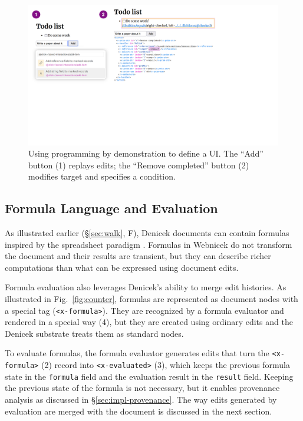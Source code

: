 \documentclass[sigconf]{acmart}
\begin{document}
\begin{figure}[t]
\includegraphics[width=1\columnwidth,clip,trim=0.5cm 8.5cm 8.5cm 0.5cm]{fig/interactive.pdf}
\caption{Using programming by demonstration to define a UI. The ``Add'' button (1) replays edits;
the ``Remove completed'' button (2) modifies target and specifies a condition. }
\label{fig:interactive}
\end{figure}


\subsection{Formula Language and Evaluation}
\label{sec:impl-eval}

As illustrated earlier (\S\ref{sec:walk}, F), Denicek documents can contain formulas inspired by the
spreadsheet paradigm \cite{nardi-1990-spreadsheets}. Formulas in Webnicek do not transform the
document and their results are transient, but they can describe richer computations than what can
be expressed using document edits.

Formula evaluation also leverages Denicek's ability to merge edit histories.
As illustrated in Fig.~\ref{fig:counter}, formulas are represented as document nodes with a
special tag ({\small\Verb_<x-formula>_}). They are recognized by a formula evaluator and
rendered in a special way (4), but they are created using ordinary
edits and the Denicek substrate treats them as standard nodes.

To evaluate formulas, the formula evaluator generates edits that turn the {\small\Verb_<x-formula>_} (2)
record into {\small\Verb_<x-evaluated>_} (3), which keeps the previous
formula state in the {\small\Verb_formula_} field and the evaluation result in the {\small\Verb_result_} field.
Keeping the previous state of the formula is not necessary, but it enables provenance analysis
as discussed in \S\ref{sec:impl-provenance}. The way edits generated by evaluation are merged
with the document is discussed in the next section.
\end{document}
